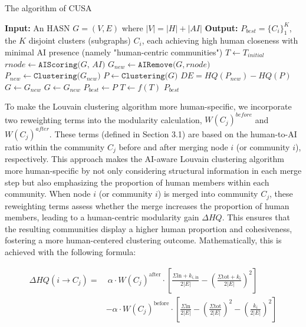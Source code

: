 \begin{algorithm}[t]
\caption{The algorithm of CUSA}
\label{alg:CUSA}
\begin{algorithmic}[1]
\Statex \textbf{Input:}  An HASN $G = (V, E)$ where $|V| = |H| + |AI|$
\Statex \textbf{Output:} $P_{best} = \{ C_i \}_1^K$, the $K$ disjoint clusters (subgraphs) $C_i$, each achieving high human closeness with minimal AI presence (namely "human-centric communities")
\STATE $T \gets T_{initial}$
    \STATE $rnode \gets \texttt{AIScoring($G$, $AI$)}$
    \STATE $G_{new} \gets \texttt{AIRemove($G, rnode$)}$
    \STATE $P_{new} \gets \texttt{Clustering($G_{new}$)}$
    \STATE $P \gets \texttt{Clustering($G$)}$
    \STATE $DE = HQ(P_{new}) - HQ(P)$
            \STATE $G \gets G_{new}$
    \ELSE 
            \STATE $G \gets G_{new}$ 
        \ENDIF
    \ENDIF
        \STATE $P_{best} \gets P$
        \STATE $T \gets f(T)$
    \ENDIF
\ENDWHILE
\RETURN {} $P_{best}$

\end{algorithmic}
\end{algorithm}


To make the Louvain clustering algorithm more human-specific, we incorporate two reweighting terms into the modularity calculation, $W(C_j)^{before}$ and $W(C_j)^{after}$. These terms (defined in Section 3.1) are based on the human-to-AI ratio within the community $C_j$ before and after merging node $i$ (or community $i$), respectively. This approach makes the AI-aware Louvain clustering algorithm more human-specific by not only considering structural information in each merge step but also emphasizing the proportion of human members within each community. When node $i$ (or community $i$) is merged into community $C_j$, these reweighting terms assess whether the merge increases the proportion of human members, leading to a human-centric modularity gain $\Delta HQ$. This ensures that the resulting communities display a higher human proportion and cohesiveness, fostering a more human-centered clustering outcome. Mathematically, this is achieved with the following formula:

\begin{align}
\Delta HQ(i \rightarrow C_j) = 
&\ \alpha \cdot W(C_j)^{\text{after}} \cdot \left[ \frac{\Sigma \text{in} + k_{i,\text{in}}}{2|E|} 
- \left(\frac{\Sigma \text{tot} + k_i}{2|E|}\right)^2 \right] \nonumber \\
&- \alpha \cdot W(C_j)^{\text{before}} \cdot \left[ \frac{\Sigma \text{in}}{2|E|} 
- \left(\frac{\Sigma \text{tot}}{2|E|}\right)^2 
- \left(\frac{k_i}{2|E|}\right)^2 \right]
\end{align}

